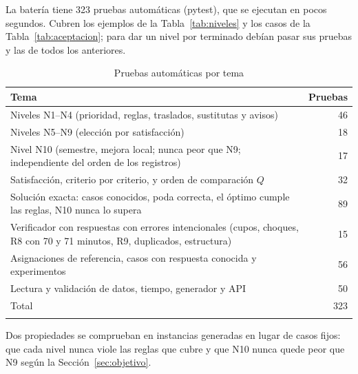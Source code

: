 La batería tiene 323 pruebas automáticas (pytest), que se ejecutan en pocos segundos. Cubren los ejemplos de la Tabla~\ref{tab:niveles} y los casos de la Tabla~\ref{tab:aceptacion}; para dar un nivel por terminado debían pasar sus pruebas y las de todos los anteriores.

\begin{table}[htbp]
\caption{Pruebas automáticas por tema}\label{tab:pruebas}
\small
\begin{tabularx}{\textwidth}{@{}Lr@{}}
\toprule
Tema & Pruebas \\
\midrule
Niveles N1--N4 (prioridad, reglas, traslados, sustitutas y avisos) & 46 \\
Niveles N5--N9 (elección por satisfacción) & 18 \\
Nivel N10 (semestre, mejora local; nunca peor que N9; independiente del orden de los registros) & 17 \\
Satisfacción, criterio por criterio, y orden de comparación $Q$ & 32 \\
Solución exacta: casos conocidos, poda correcta, el óptimo cumple las reglas, N10 nunca lo supera & 89 \\
Verificador con respuestas con errores intencionales (cupos, choques, R8 con 70 y 71 minutos, R9, duplicados, estructura) & 15 \\
Asignaciones de referencia, casos con respuesta conocida y experimentos & 56 \\
Lectura y validación de datos, tiempo, generador y API & 50 \\
\midrule
Total & 323 \\
\botrule
\end{tabularx}
\end{table}

Dos propiedades se comprueban en instancias generadas en lugar de casos fijos: que cada nivel nunca viole las reglas que cubre y que N10 nunca quede peor que N9 según la Sección~\ref{sec:objetivo}.
